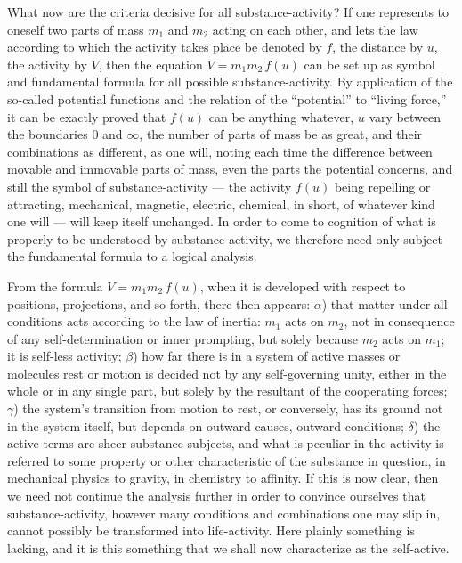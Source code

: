\documentclass[12pt]{book}
\begin{document}
What now are the criteria decisive for all substance-activity? If one represents to oneself
two parts of mass $m_1$ and $m_2$ acting on each other, and lets the law according to which
the activity takes place be denoted by $f$, the distance by $u$, the activity by $V$, then
the equation $V = m_1 m_2\, f(u)$ can be set up as symbol and fundamental formula for all
possible substance-activity. By application of the so-called potential functions and the
relation of the ``potential'' to ``living force,'' it can be exactly proved that $f(u)$ can
be anything whatever, $u$ vary between the boundaries $0$ and $\infty$, the number of parts
of mass be as great, and their combinations as different, as one will, noting each time the
difference between movable and immovable parts of mass, even the parts the potential
concerns, and still the symbol of substance-activity --- the activity $f(u)$ being
repelling or attracting, mechanical, magnetic, electric, chemical, in short, of whatever
kind one will --- will keep itself unchanged. In order to come to cognition of what is
properly to be understood by substance-activity, we therefore need only subject the
fundamental formula to a logical analysis.

From the formula $V = m_1 m_2\, f(u)$, when it is developed with respect to positions,
projections, and so forth, there then appears: $\alpha$) that matter under all conditions
acts according to the law of inertia: $m_1$ acts on $m_2$, not in consequence of any
self-determination or inner prompting, but solely because $m_2$ acts on $m_1$; it is
self-less activity; $\beta$) how far there is in a system of active masses or molecules
rest or motion is decided not by any self-governing unity, either in the whole or in any
single part, but solely by the resultant of the cooperating forces; $\gamma$) the system's
transition from motion to rest, or conversely, has its ground not in the system itself, but
depends on outward causes, outward conditions; $\delta$) the active terms are sheer
substance-subjects, and what is peculiar in the activity is referred to some property or
other characteristic of the substance in question, in mechanical physics to gravity, in
chemistry to affinity. If this is now clear, then we need not continue the analysis further
in order to convince ourselves that substance-activity, however many conditions and
combinations one may slip in, cannot possibly be transformed into life-activity. Here
plainly something is lacking, and it is this something that we shall now characterize as the
self-active.
\end{document}
